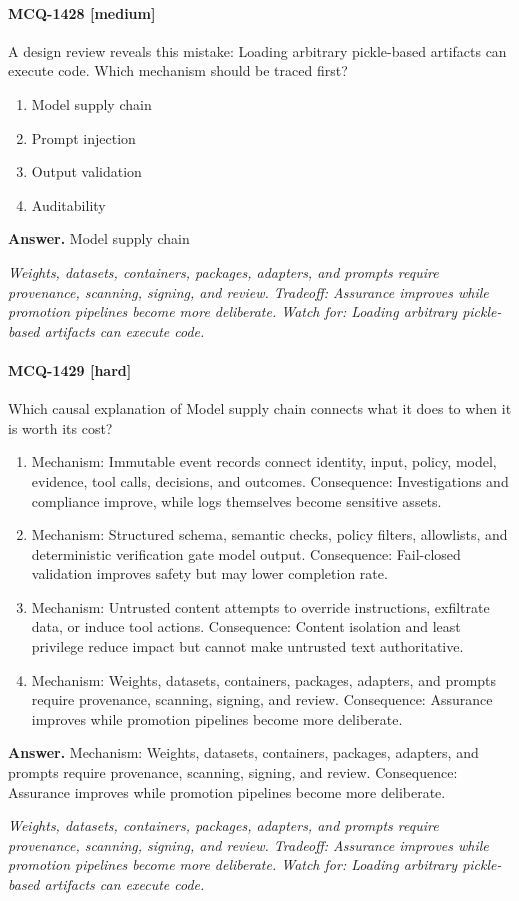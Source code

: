 \paragraph{MCQ-1428 [medium]} A design review reveals this mistake: Loading arbitrary pickle-based artifacts can execute code. Which mechanism should be traced first?
\begin{enumerate}[label=\Alph*.]
\item Model supply chain
\item Prompt injection
\item Output validation
\item Auditability
\end{enumerate}
\noindent\textbf{Answer.} Model supply chain
\par\textit{Weights, datasets, containers, packages, adapters, and prompts require provenance, scanning, signing, and review. Tradeoff: Assurance improves while promotion pipelines become more deliberate. Watch for: Loading arbitrary pickle-based artifacts can execute code.}
\paragraph{MCQ-1429 [hard]} Which causal explanation of Model supply chain connects what it does to when it is worth its cost?
\begin{enumerate}[label=\Alph*.]
\item Mechanism: Immutable event records connect identity, input, policy, model, evidence, tool calls, decisions, and outcomes. Consequence: Investigations and compliance improve, while logs themselves become sensitive assets.
\item Mechanism: Structured schema, semantic checks, policy filters, allowlists, and deterministic verification gate model output. Consequence: Fail-closed validation improves safety but may lower completion rate.
\item Mechanism: Untrusted content attempts to override instructions, exfiltrate data, or induce tool actions. Consequence: Content isolation and least privilege reduce impact but cannot make untrusted text authoritative.
\item Mechanism: Weights, datasets, containers, packages, adapters, and prompts require provenance, scanning, signing, and review. Consequence: Assurance improves while promotion pipelines become more deliberate.
\end{enumerate}
\noindent\textbf{Answer.} Mechanism: Weights, datasets, containers, packages, adapters, and prompts require provenance, scanning, signing, and review. Consequence: Assurance improves while promotion pipelines become more deliberate.
\par\textit{Weights, datasets, containers, packages, adapters, and prompts require provenance, scanning, signing, and review. Tradeoff: Assurance improves while promotion pipelines become more deliberate. Watch for: Loading arbitrary pickle-based artifacts can execute code.}
